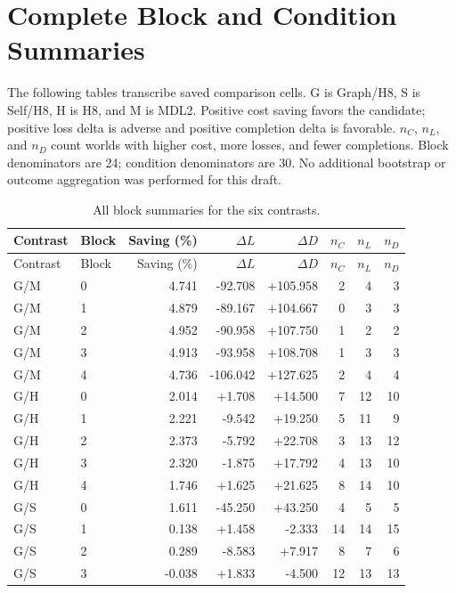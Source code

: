 \documentclass[preprint,12pt]{elsarticle}
\begin{document}
\clearpage
\appendix
\section{Complete Block and Condition Summaries}
\label{app:strata}
The following tables transcribe saved comparison cells. G is Graph/H8,
S is Self/H8, H is H8, and M is MDL2. Positive cost saving favors the candidate;
positive loss delta is adverse and positive completion delta is favorable.
$n_C$, $n_L$, and $n_D$ count worlds with higher cost, more losses, and fewer
completions. Block denominators are 24; condition denominators are 30.
No additional bootstrap or outcome aggregation was performed for this draft.

{\footnotesize
\renewcommand{\arraystretch}{0.92}
\setlength{\tabcolsep}{4pt}
\begin{longtable}{llrrrrrr}
\caption{All block summaries for the six contrasts.}\label{tab:blocks}\\
\toprule
Contrast & Block & Saving (\%) & $\Delta L$ & $\Delta D$ & $n_C$ & $n_L$ & $n_D$\\
\midrule
\endfirsthead
\toprule
Contrast & Block & Saving (\%) & $\Delta L$ & $\Delta D$ & $n_C$ & $n_L$ & $n_D$\\
\midrule
\endhead
\bottomrule
\endfoot
G/M & 0 & 4.741 & -92.708 & +105.958 & 2 & 4 & 3 \\
G/M & 1 & 4.879 & -89.167 & +104.667 & 0 & 3 & 3 \\
G/M & 2 & 4.952 & -90.958 & +107.750 & 1 & 2 & 2 \\
G/M & 3 & 4.913 & -93.958 & +108.708 & 1 & 3 & 3 \\
G/M & 4 & 4.736 & -106.042 & +127.625 & 2 & 4 & 4 \\
\addlinespace
G/H & 0 & 2.014 & +1.708 & +14.500 & 7 & 12 & 10 \\
G/H & 1 & 2.221 & -9.542 & +19.250 & 5 & 11 & 9 \\
G/H & 2 & 2.373 & -5.792 & +22.708 & 3 & 13 & 12 \\
G/H & 3 & 2.320 & -1.875 & +17.792 & 4 & 13 & 10 \\
G/H & 4 & 1.746 & +1.625 & +21.625 & 8 & 14 & 10 \\
\addlinespace
G/S & 0 & 1.611 & -45.250 & +43.250 & 4 & 5 & 5 \\
G/S & 1 & 0.138 & +1.458 & -2.333 & 14 & 14 & 15 \\
G/S & 2 & 0.289 & -8.583 & +7.917 & 8 & 7 & 6 \\
G/S & 3 & -0.038 & +1.833 & -4.500 & 12 & 13 & 13 \\

\end{longtable}}
\end{document}
